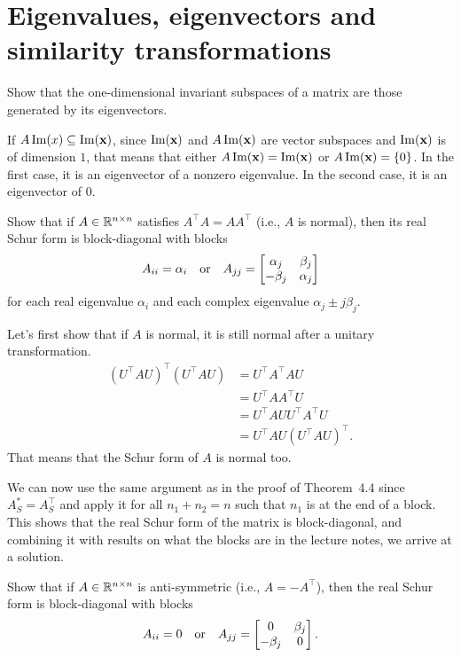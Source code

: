 \section{Eigenvalues, eigenvectors and similarity transformations}

Show that the one-dimensional invariant subspaces of a matrix are those generated by its eigenvectors.

\begin{solution}
	If $A \operatorname{Im}(x) \subseteq \operatorname{Im}(\mathbf{x})$, since $\operatorname{Im}(\mathbf{x})$ and $A\operatorname{Im}(\mathbf{x})$
	are vector subspaces and $\operatorname{Im}(\mathbf{x})$ is of dimension \(1\),
	that means that either $A\operatorname{Im}(\mathbf{x}) = \operatorname{Im}(\mathbf{x})$ or $A\operatorname{Im}(\mathbf{x}) = \{0\}$.
	In the first case, it is an eigenvector of a nonzero eigenvalue.
	In the second case, it is an eigenvector of \(0\).
\end{solution}

Show that if \(A \in \mathbb{R}^{n \times n}\) satisfies \(A^\top A = AA^\top\) (i.e., \(A\) is normal), then its real Schur form is block-diagonal with blocks
\[
A_{ii} = \alpha_i \quad \textnormal{or} \quad A_{jj} = \begin{bmatrix} \alpha_j & \beta_j \\ -\beta_j & \alpha_j \end{bmatrix}
\]
for each real eigenvalue \(\alpha_i\) and each complex eigenvalue \(\alpha_j \pm j \beta_j\).

\begin{solution}
	Let's first show that if $A$ is normal,
	it is still normal after a unitary transformation.
	\begin{align*}
	(U^\top AU)^\top (U^\top AU)
	& = U^\top A^\top AU\\
	& = U^\top AA^\top U\\
	& = U^\top AUU^\top A^\top U\\
	& = U^\top AU(U^\top AU)^\top.
	\end{align*}
	That means that the Schur form of $A$ is normal too.
	
	We can now use the same argument as in the proof of Theorem~4.4 since $A_S^* = A_S^\top$
	and apply it for all $n_1+n_2 = n$ such that $n_1$ is at the end of a block.
	This shows that the real Schur form of the matrix is block-diagonal, and combining it with results on what the blocks are in the lecture notes, we arrive at a solution.
\end{solution}

Show that if \(A \in \mathbb{R}^{n \times n}\) is anti-symmetric (i.e., \(A = -A^\top\)), then the real Schur form is block-diagonal with blocks
\[
A_{ii} = 0 \quad \textnormal{or} \quad A_{jj} = \begin{bmatrix} 0 & \beta_j \\ -\beta_j & 0 \end{bmatrix}.
\]

